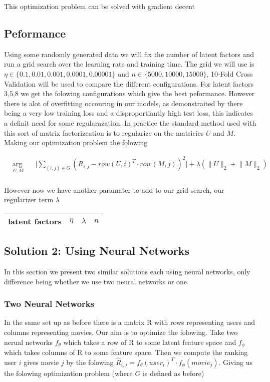 \documentclass{article}
\begin{document}
This optimization problem can be solved with gradient decent

\subsection{Peformance}
Using some randomly generated data we will fix the number of latent factors and run a grid search over the learning rate and training time. The grid we will use is $\eta \in \{0.1, 0.01, 0.001, 0.0001, 0.00001\}$ and $n \in \{5000, 10000, 15000\}$, 10-Fold Cross Validation will be used to compare the different configurations. For latent factors 3,5,8 we get the folowing configurations which give the best peformance. However there is alot of overfitting occouring in our models, as demonstraited by there being a very low training loss and a disproportiantly high test loss, this indicates a definit need for some regularazation. In practice the standard method used with this sort of matrix factorizeation is to regularize on the matricies $U$ and $M$. Making our optimization problem the folowing

\begin{equation*}
\begin{aligned}
& \underset{U, M}{\text{arg min}}
& & \big[ \sum_{(i,j) \in G} (R_{i,j} - row(U, i)^T \cdot row(M, j))^2 \big] + \lambda (\lVert U \lVert_2 + \lVert M \lVert_2)\\
\end{aligned}
\end{equation*}

However now we have another paramater to add to our grid search, our regularizer term $\lambda$

\begin{center}
\begin{tabular}{| c | c | c | c |}
\hline
latent factors & $\eta$ & $\lambda$ & $n$ \\
\hline
\hline

\end{tabular}
\end{center}

\subsection{Solution 2: Using Neural Networks}

In this section we present two similar solutions each using neural networks, only difference being whether we use two neural networks or one.

\subsubsection{Two Neural Networks}
In the same set up as before there is a matrix R with rows representing users and columns representing movies. Our aim is to optimize the folowing. Take two nerual networks $f_{\theta}$ which takes a row of R to some latent feature space and $f_{\phi}$ which takes columns of R to some feature space. Then we compute the ranking user $i$ gives movie $j$ by the folowing $\hat{R}_{i,j} = f_{\theta}(user_i)^T \cdot f_{\phi}(movie_j)$. Giving us the folowing optimization problem (where $G$ is defined as before)
\end{document}
